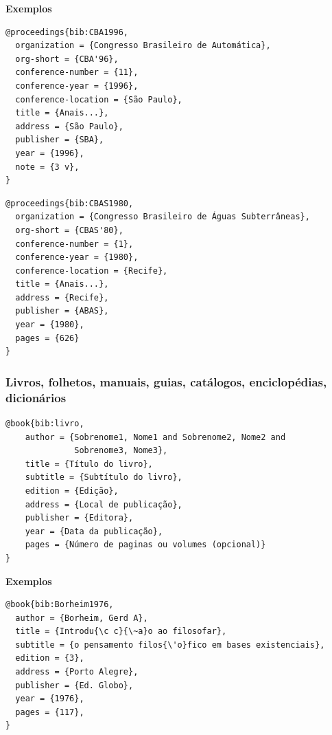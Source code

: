 \documentclass[a4paper,12pt,oneside,onecolumn,final,fleqn]{repUERJ}
\begin{document}
\noindent\textbf{Exemplos}\\

\noindent{}

\begin{verbatim}
@proceedings{bib:CBA1996,
  organization = {Congresso Brasileiro de Automática},
  org-short = {CBA'96},
  conference-number = {11},
  conference-year = {1996},
  conference-location = {São Paulo},
  title = {Anais...},
  address = {São Paulo},
  publisher = {SBA},
  year = {1996},
  note = {3 v},
}
\end{verbatim}

\noindent{}

\begin{verbatim}
@proceedings{bib:CBAS1980,
  organization = {Congresso Brasileiro de Águas Subterrâneas},
  org-short = {CBAS'80},
  conference-number = {1},
  conference-year = {1980},
  conference-location = {Recife},
  title = {Anais...},
  address = {Recife},
  publisher = {ABAS},
  year = {1980},
  pages = {626}
}
\end{verbatim}

\subsubsection{Livros, folhetos, manuais, guias, catálogos, enciclopédias, dicionários}

\noindent{}

\begin{verbatim}
@book{bib:livro,
    author = {Sobrenome1, Nome1 and Sobrenome2, Nome2 and
              Sobrenome3, Nome3},
    title = {Título do livro},
    subtitle = {Subtítulo do livro},
    edition = {Edição},
    address = {Local de publicação},
    publisher = {Editora},
    year = {Data da publicação},
    pages = {Número de paginas ou volumes (opcional)}
}
\end{verbatim}%

\noindent\textbf{Exemplos}\\

\noindent{}

\begin{verbatim}
@book{bib:Borheim1976,
  author = {Borheim, Gerd A},
  title = {Introdu{\c c}{\~a}o ao filosofar},
  subtitle = {o pensamento filos{\'o}fico em bases existenciais},
  edition = {3},
  address = {Porto Alegre},
  publisher = {Ed. Globo},
  year = {1976},
  pages = {117},
}
\end{verbatim}
\end{document}

